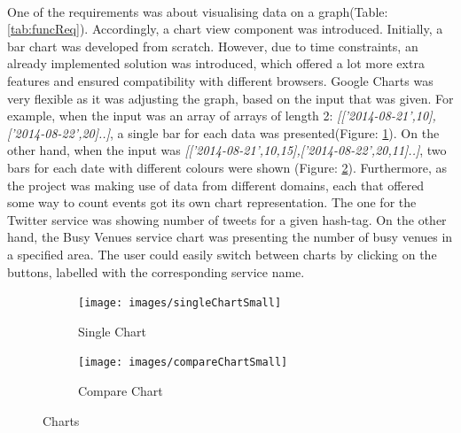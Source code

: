 \documentclass{l4proj}
\begin{document}
\paragraph{}
One of the requirements was about visualising data on a graph(Table: \ref{tab:funcReq}). Accordingly, a chart view component was introduced. Initially, a bar chart was developed from scratch. However, due to time constraints, an already implemented solution was introduced, which offered a lot more extra features and ensured compatibility with different browsers. Google Charts was very flexible as it was adjusting the graph, based on the input that was given. For example, when the input was an array of arrays of length 2: \textit{[['2014-08-21',10],['2014-08-22',20]..]}, a single bar for each data was presented(Figure: \ref{singlechartsmall}). On the other hand, when the input was \textit{[['2014-08-21',10,15],['2014-08-22',20,11]..]}, two bars for each date with different colours were shown (Figure: \ref{comparechartsmall}). Furthermore, as the project was making use of data from different domains, each that offered some way to count events got its own chart representation. The one for the Twitter service was showing number of tweets for a given hash-tag. On the other hand, the Busy Venues service chart was presenting the number of busy venues in a specified area. The user could easily switch between charts by clicking on the buttons, labelled with the corresponding service name.


\begin{figure}[H]
	\centering
	\begin{subfigure}{.3\textwidth}
		\texttt{[image: images/singleChartSmall]}
		\caption{Single Chart}
		\label{singlechartsmall}
	\end{subfigure}
	\begin{subfigure}{.3\textwidth}
		\texttt{[image: images/compareChartSmall]}
		\caption{Compare Chart}
		\label{comparechartsmall}
	\end{subfigure}
	\caption{Charts}
	\label{fig:chartsmall}
\end{figure}
\end{document}
